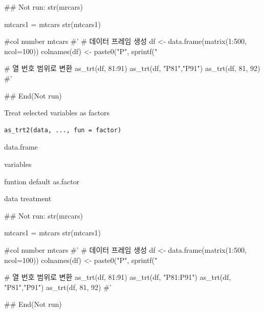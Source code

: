 \documentclass[a4paper]{book}
\begin{document}
\begin{Examples}
\begin{ExampleCode}
\#\# Not run: 
 str(mrcars)

 mtcars1 = mtcars %
 str(mtcars1)

 #col number
 mtcars%
#'
# 데이터 프레임 생성
df <- data.frame(matrix(1:500, ncol=100))
colnames(df) <- paste0("P", sprintf("%

# 열 번호 범위로 변환
as_trt(df, 81:91)%
as_trt(df, "P81","P91")%
as_trt(df, 81, 92)%
#'



## End(Not run)

\end{ExampleCode}
\end{Examples}
%
\begin{Description}
Treat selected variables as factors
\end{Description}
%
\begin{Usage}
\begin{verbatim}
as_trt2(data, ..., fun = factor)
\end{verbatim}
\end{Usage}
%
\begin{Arguments}
\begin{ldescription}
\item[\code{data}] data.frame

\item[\code{...}] variables

\item[\code{fun}] funtion default as.factor
\end{ldescription}
\end{Arguments}
%
\begin{Value}
data treatment
\end{Value}
%
\begin{Examples}
\begin{ExampleCode}
\#\# Not run: 
 str(mrcars)

 mtcars1 = mtcars %
 str(mtcars1)

 #col number
 mtcars%
#'
# 데이터 프레임 생성
df <- data.frame(matrix(1:500, ncol=100))
colnames(df) <- paste0("P", sprintf("%

# 열 번호 범위로 변환
as_trt(df, 81:91)%
as_trt(df, "P81:P91")%
as_trt(df, "P81","P91")%
as_trt(df, 81, 92)%
#'



## End(Not run)

\end{ExampleCode}
\end{Examples}
\end{document}
